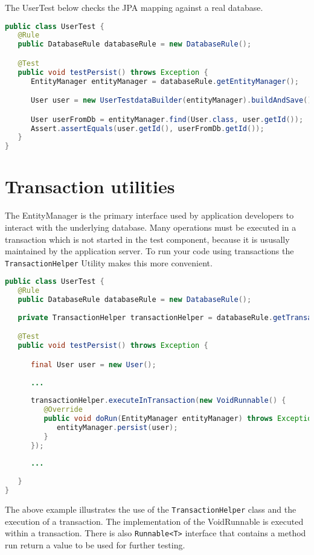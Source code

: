 The UserTest below checks the JPA mapping against a real database.

\begin{lstlisting}[language={JAVA},caption=User persistence test]
public class UserTest {
   @Rule
   public DatabaseRule databaseRule = new DatabaseRule();

   @Test
   public void testPersist() throws Exception {
      EntityManager entityManager = databaseRule.getEntityManager();

      User user = new UserTestdataBuilder(entityManager).buildAndSave();

      User userFromDb = entityManager.find(User.class, user.getId());
      Assert.assertEquals(user.getId(), userFromDb.getId());
   }
}
\end{lstlisting}

\section{Transaction utilities}

The EntityManager is the primary interface used by application developers to interact with the underlying database.
Many operations must be executed in a transaction which is not started in the test component, because it is ususally maintained by
the application server. To run your code using transactions the \verb|TransactionHelper| Utility makes this more convenient.

\begin{lstlisting}[language={JAVA},caption=Transaction utilities]
public class UserTest {
   @Rule
   public DatabaseRule databaseRule = new DatabaseRule();
   
   private TransactionHelper transactionHelper = databaseRule.getTransactionHelper();

   @Test
   public void testPersist() throws Exception {

      final User user = new User();
      
      ...
      
      transactionHelper.executeInTransaction(new VoidRunnable() {
         @Override
         public void doRun(EntityManager entityManager) throws Exception {
            entityManager.persist(user);
         }
      });
      
      ...
      
   }
}
\end{lstlisting}

The above example illustrates the use of the \verb|TransactionHelper| class and the execution of a transaction. The implementation of the VoidRunnable is executed within a transaction. There is also \verb|Runnable<T>| interface that contains a method run return a value to be used for further testing.

